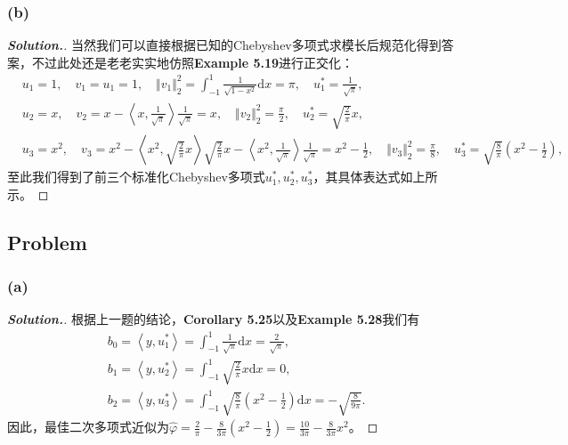 \documentclass{ctexart}
\begin{document}
\begin{sloppypar}
\subsubsection*{(b)}
\begin{proof}[\textbf{Solution.}]
当然我们可以直接根据已知的Chebyshev多项式求模长后规范化得到答案，不过此处还是老老实实地仿照\textbf{Example 5.19}进行正交化：
\begin{equation}
    \begin{split}
        &u_1=1,\quad v_1 = u_1 = 1,\quad \Vert v_1 \Vert_2^2 = \int_{-1}^1 \frac{1}{\sqrt{1-x^2}}  \mathrm{d}x= \pi, \quad u_1^* = \frac{1}{\sqrt{\pi}}, \\
        &u_2=x,\quad v_2 = x - \left \langle x,\frac{1}{\sqrt{\pi}} \right \rangle\frac{1}{\sqrt{\pi}} = x,\quad \Vert v_2 \Vert_2^2 = \frac{\pi}{2}  , \quad u_2^* = \sqrt{\frac{2}{\pi}}x, \\
        &u_3=x^2,\quad v_3 = x^2 - \left \langle x^2,\sqrt{\frac{2}{\pi}}x \right \rangle\sqrt{\frac{2}{\pi}}x -  \left \langle x^2,\frac{1}{\sqrt{\pi}} \right \rangle\frac{1}{\sqrt{\pi}} = x^2 - \frac{1}{2},\quad \Vert v_3 \Vert_2^2 = \frac{\pi}{8}  , \quad u_3^* = \sqrt{\frac{8}{\pi}}\left(x^2-\frac{1}{2}\right),
    \end{split}
\end{equation}
至此我们得到了前三个标准化Chebyshev多项式$u_1^*,u_2^*,u_3^*$，其具体表达式如上所示。
\end{proof}

\subsection*{Problem \uppercase\expandafter{}}
\subsubsection*{(a)}
\begin{proof}[\textbf{Solution.}]
根据上一题的结论，\textbf{Corollary 5.25}以及\textbf{Example 5.28}我们有
\begin{equation}
    \begin{split}
        &b_0 = \left \langle y,u_1^* \right \rangle = \int_{-1}^1 \frac{1}{\sqrt{\pi}}  \mathrm{d}x = \frac{2}{\sqrt{\pi}}, \\
        &b_1 = \left \langle y,u_2^* \right \rangle = \int_{-1}^1 \sqrt{\frac{2}{\pi}}x  \mathrm{d}x = 0, \\
        &b_2 = \left \langle y,u_3^* \right \rangle = \int_{-1}^1 \sqrt{\frac{8}{\pi}}\left(x^2-\frac{1}{2}\right)  \mathrm{d}x = -\sqrt{\frac{8}{9\pi}}.
    \end{split}
\end{equation}
因此，最佳二次多项式近似为$\hat{\varphi} = \frac{2}{\pi} - \frac{8}{3\pi}\left(x^2-\frac{1}{2}\right)=\frac{10}{3\pi} - \frac{8}{3\pi}x^2$。
\end{proof}

\end{sloppypar}
\end{document}
